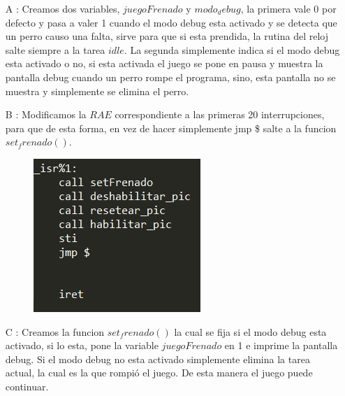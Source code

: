 \begin{itemize}

\item[A]: Creamos dos variables, $juegoFrenado$ y $modo_debug$, la primera vale 0 por defecto y pasa a valer 1 cuando el modo debug esta activado y se detecta que un perro causo una falta, sirve para que si esta prendida, la rutina del reloj salte siempre a la tarea $idle$. La segunda simplemente indica si el modo debug esta activado o no, si esta activada el juego se pone en pausa y muestra la pantalla debug cuando un perro rompe el programa, sino, esta pantalla no se muestra y simplemente se elimina el perro.

\item[B]: Modificamos la $RAE$ correspondiente a las primeras 20 interrupciones, para que de esta forma, en vez de hacer simplemente jmp \$ salte a la funcion $set_frenado()$.

\begin{figure}[H]
\begin{center}
\includegraphics[width=\linewidth]{ejercicio7/isr.png}
\endminipage
\end{center}
\end{figure}


\item[C]: Creamos la funcion $set_frenado()$ la cual se fija si el modo debug esta activado, si lo esta, pone la variable $juegoFrenado$ en 1 e imprime la pantalla debug. Si el modo debug no esta activado simplemente elimina la tarea actual, la cual es la que rompió el juego. De esta manera el juego puede continuar.


\end{itemize}
